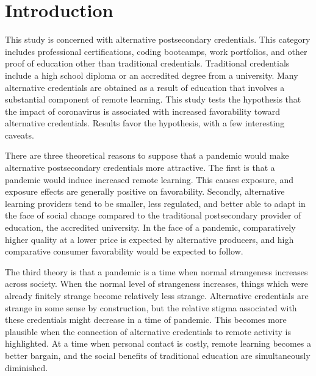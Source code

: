 \documentclass[review]{elsarticle}
\begin{document}
\pagebreak
\linenumbers

\section{Introduction}

This study is concerned with alternative postsecondary credentials.
This category includes professional certifications, coding bootcamps, work portfolios,
and other proof of education other than traditional credentials.
Traditional credentials include a high school diploma or an accredited degree from a university.
Many alternative credentials are obtained as a result of education that involves a substantial component of remote learning.
This study tests the hypothesis that the impact of coronavirus is associated with increased favorability toward alternative credentials.
Results favor the hypothesis, with a few interesting caveats.

There are three theoretical reasons to suppose that a pandemic would make alternative postsecondary credentials more attractive.
The first is that a pandemic would induce increased remote learning.
This causes exposure, and exposure effects are generally positive on favorability.
Secondly, alternative learning providers tend to be smaller, less regulated, and better able to adapt in the face of social change
compared to the traditional postsecondary provider of education, the accredited university.
In the face of a pandemic, comparatively higher quality at a lower price is expected by alternative producers,
and high comparative consumer favorability would be expected to follow.

The third theory is that a pandemic is a time when normal strangeness increases across society.
When the normal level of strangeness increases, things which were already finitely strange become relatively less strange.
Alternative credentials are strange in some sense by construction,
but the relative stigma associated with these credentials might decrease in a time of pandemic.
This becomes more plausible when the connection of alternative credentials to remote activity is highlighted.
At a time when personal contact is costly,
remote learning becomes a better bargain,
and the social benefits of traditional education are simultaneously diminished.
\end{document}
